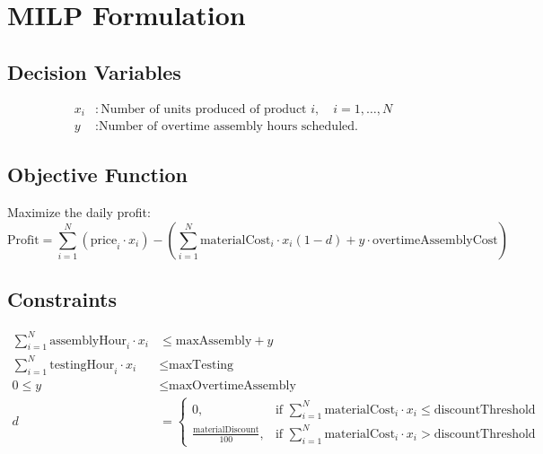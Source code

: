 \documentclass{article}
\begin{document}
\section*{MILP Formulation}

\subsection*{Decision Variables}
\begin{align*}
x_i &: \text{Number of units produced of product } i, \quad i = 1, \ldots, N\\
y &: \text{Number of overtime assembly hours scheduled.}
\end{align*}

\subsection*{Objective Function}
Maximize the daily profit:
\begin{equation*}
\text{Profit} = \sum_{i=1}^{N} (\text{price}_i \cdot x_i) - \left( \sum_{i=1}^{N} \text{materialCost}_i \cdot x_i (1 - d) + y \cdot \text{overtimeAssemblyCost} \right)
\end{equation*}

\subsection*{Constraints}
\begin{align}
\sum_{i=1}^{N} \text{assemblyHour}_i \cdot x_i &\leq \text{maxAssembly} + y \tag{1}\\
\sum_{i=1}^{N} \text{testingHour}_i \cdot x_i &\leq \text{maxTesting} \tag{2}\\
0 \leq y &\leq \text{maxOvertimeAssembly} \tag{3}\\
d &= 
\begin{cases} 
0, & \text{if } \sum_{i=1}^{N} \text{materialCost}_i \cdot x_i \leq \text{discountThreshold}\\
\frac{\text{materialDiscount}}{100}, & \text{if } \sum_{i=1}^{N} \text{materialCost}_i \cdot x_i > \text{discountThreshold}
\end{cases} \tag{4}
\end{align}
\end{document}
